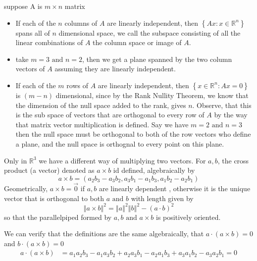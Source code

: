 \documentclass[11pt]{book}
\begin{document}
suppose A is $m\times n$ matrix 
\begin{itemize}
    \item If each of the $n$ columns of $A$ are linearly independent, then $\left\{ Ax: x \in  \mathbb{R} ^{n}  \right\} $ spans all of $n$ dimensional space, we call the subspace consisting of all the linear combinations of $A$ the column space or image of $A$.
    \item take $m = 3 \text{ and } n= 2$, then we get a plane spanned by the two column vectors of $A$ assuming they are linearly independent. 
    \item If each of the $m$ rows of $A$ are linearly independent, then $\left\{ x \in \mathbb{R} ^{n} : Ax= 0 \right\} $ is $\left( m - n \right) $ dimensional, since by the Rank Nullity Theorem, we know that the dimension of the null space added to the rank, gives $n$. Observe, that this is the sub space of vectors that are orthogonal to every row of $A$ by the way that matrix vector multiplication is defined.  Say we have $m= 2 \text{ and } n = 3$ then the null space must be orthogonal to both of the row vectors who define a plane, and the null space is orthognal to every point on this plane.
\end{itemize}

\newpage

\begin{defn}\label{defn:cross_product}
    Only in $\mathbb{R} ^{3} $ we have a different way of multiplying two vectors. For $a, b$,  the cross product (a vector) denoted as $a\times b$ id defined, algebraically by 
    \[
        a\times b= \left( a_2b_3 - a_3b_2, a_3b_1 - a_1b_3, a_1b_2 - a_2b_1 \right) 
    \]
    Geometrically, $a\times b = \vec{0} $ if $a, b$ are linearly dependent , otherwise it is the unique vector that is orthogonal to both $a \text{ and } b$ with length given by
    \[
        \left\Vert a\times b \right\Vert ^2 = \left\Vert a \right\Vert ^2 \left\Vert b \right\Vert ^2  - \left( a \cdot b \right) ^2 
    \]
    so that the parallelpiped formed by $a, b \text{ and } a\times b$ is positively oriented.
\end{defn}

We can verify that the definitions are the same algebraically, that $a  \cdot \left( a\times b \right) = 0$ and $b \cdot \left( a\times b \right) = 0$ 
\begin{align*}
    a \cdot \left( a\times b \right) &= a_1a_2b_3 - a_1a_3b_2 + a_2a_3b_1 - a_2 a_1 b_3 + a_3a_1 b_2 - a_3a_2b_1 = 0 \\ 
\end{align*}
\end{document}
